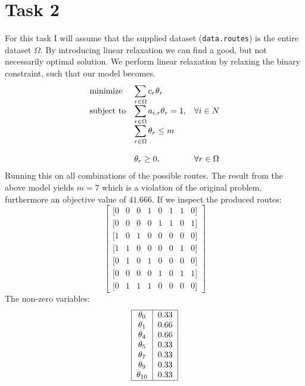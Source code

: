 \documentclass{article}
\begin{document}
    \section{Task 2}
    For this task I will assume that the supplied dataset (\texttt{data.routes}) is the entire dataset $\Omega$.
    By introducing linear relaxation we can find a good, but not necessarily optimal solution.
    We perform linear relaxation by relaxing the binary constraint, such that our model becomes.
    \begin{equation*}
        \begin{array}{ll@{}ll}
            \text{minimize}  & \displaystyle\sum_{r \in \Omega} c_r \theta_r& &\\
            \text{subject to}& \displaystyle\sum_{r \in \Omega} a_{i, r} \theta_r = 1 ,&   &\forall i \in N\\
            & \displaystyle\sum_{r \in \Omega} \theta_r \leq m &&\\\\
            & \displaystyle \theta_r  \geq 0,  && \forall r \in \Omega
        \end{array}
    \end{equation*}
    Running this on all combinations of the possible routes.
    The result from the above model yields $m = 7$ which is a violation of the original problem, furthermore an objective value of $41.666$.
    If we inspect the produced routes:
    \[
    \begin{bmatrix}
        [0 & 0 & 0 & 1 & 0 & 1 & 1 & 0] \\
        [0 & 0 & 0 & 0 & 1 & 1 & 0 & 1] \\
        [1 & 0 & 1 & 0 & 0 & 0 & 0 & 0] \\
        [1 & 1 & 0 & 0 & 0 & 0 & 1 & 0] \\
        [0 & 1 & 0 & 1 & 0 & 0 & 0 & 0] \\
        [0 & 0 & 0 & 0 & 1 & 0 & 1 & 1] \\
        [0 & 1 & 1 & 1 & 0 & 0 & 0 & 0]
    \end{bmatrix}
    \]
    The non-zero variables:
    \[
        \begin{tabular}{ |c|c| }
            \hline
            $\theta_{0}$ & 0.33 \\
            $\theta_{1}$ & 0.66 \\
            $\theta_{4}$ & 0.66 \\
            $\theta_{5}$ & 0.33 \\
            $\theta_{7}$ & 0.33 \\
            $\theta_{9}$ & 0.33 \\
            $\theta_{10}$ & 0.33 \\
            \hline
        \end{tabular}
    \]
\end{document}
